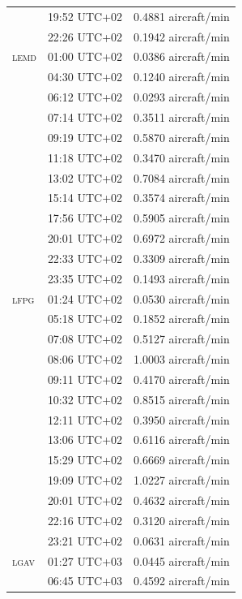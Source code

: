 \documentclass[]{elsarticle}
\newcommand{\airp}[1]{\textcolor{#1}{\textsc{#1}}}
\begin{document}
\begin{center}
\begin{longtable}{lll}
           & 19:52 UTC+02 &  0.4881 aircraft/min \\
           & 22:26 UTC+02 &  0.1942 aircraft/min \\
      \airp{lemd} & 01:00 UTC+02 &  0.0386 aircraft/min \\
           & 04:30 UTC+02 &  0.1240 aircraft/min \\
           & 06:12 UTC+02 &  0.0293 aircraft/min \\
           & 07:14 UTC+02 &  0.3511 aircraft/min \\
           & 09:19 UTC+02 &  0.5870 aircraft/min \\
           & 11:18 UTC+02 &  0.3470 aircraft/min \\
           & 13:02 UTC+02 &  0.7084 aircraft/min \\
           & 15:14 UTC+02 &  0.3574 aircraft/min \\
           & 17:56 UTC+02 &  0.5905 aircraft/min \\
           & 20:01 UTC+02 &  0.6972 aircraft/min \\
           & 22:33 UTC+02 &  0.3309 aircraft/min \\
           & 23:35 UTC+02 &  0.1493 aircraft/min \\
      \airp{lfpg} & 01:24 UTC+02 &  0.0530 aircraft/min \\
           & 05:18 UTC+02 &  0.1852 aircraft/min \\
           & 07:08 UTC+02 &  0.5127 aircraft/min \\
           & 08:06 UTC+02 &  1.0003 aircraft/min \\
           & 09:11 UTC+02 &  0.4170 aircraft/min \\
           & 10:32 UTC+02 &  0.8515 aircraft/min \\
           & 12:11 UTC+02 &  0.3950 aircraft/min \\
           & 13:06 UTC+02 &  0.6116 aircraft/min \\
           & 15:29 UTC+02 &  0.6669 aircraft/min \\
           & 19:09 UTC+02 &  1.0227 aircraft/min \\
           & 20:01 UTC+02 &  0.4632 aircraft/min \\
           & 22:16 UTC+02 &  0.3120 aircraft/min \\
           & 23:21 UTC+02 &  0.0631 aircraft/min \\
      \airp{lgav} & 01:27 UTC+03 &  0.0445 aircraft/min \\
           & 06:45 UTC+03 &  0.4592 aircraft/min \\

\end{longtable}
\end{center}
\end{document}
